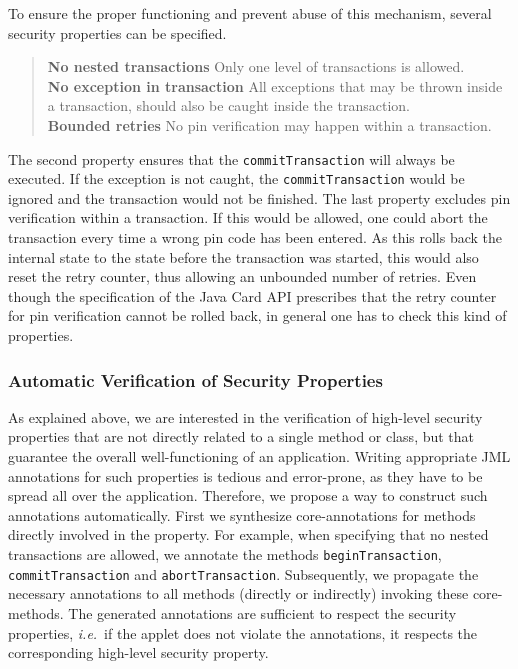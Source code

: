 To ensure the proper functioning and prevent abuse of this mechanism,
several security properties can be specified.

\begin{quote}
\textbf{No nested transactions} Only one level of transactions
is allowed.\smallskip\\
\textbf{No exception in transaction} All exceptions that may be thrown
inside a transaction, should also be caught inside the
transaction.\smallskip\\
\textbf{Bounded retries}
No pin verification may happen within a transaction.
\end{quote} 
The second property ensures that the \texttt{commitTransaction} will
always be executed. If the exception is not caught, the
\texttt{commitTransaction} would be ignored and the transaction would
not be finished. The last property excludes pin verification within a
transaction. If this would be allowed, one could abort the transaction
every time a wrong pin code has been entered. As this rolls
back the internal state to the state before the transaction was
started, this would also reset the retry counter, thus allowing an
unbounded number of retries. Even though the specification of the Java
Card API prescribes that the retry counter for pin verification cannot
be rolled back, in general one has to check this kind of properties.



\subsubsection{Automatic Verification of Security Properties}\label{SecVerif}
As explained above, we are interested in the verification of
high-level security properties that are not directly related to a
single method or class, but that guarantee the overall
well-functioning of an application. Writing appropriate JML
annotations for such properties is tedious and error-prone, as they
have to be spread all over the application. Therefore, we propose a
way to construct such annotations automatically. First we synthesize
core-annotations for methods directly involved in the property.  For
example, when specifying that no nested transactions are allowed, we
annotate the methods \texttt{beginTransaction},
\texttt{commitTransaction} and
\texttt{abortTransaction}. Subsequently, we propagate the necessary 
annotations to all methods (directly or indirectly) invoking these
core-methods.  The generated annotations are sufficient to respect the
security properties, \emph{i.e.}~if the applet does not violate the
annotations, it respects the corresponding high-level security
property.

